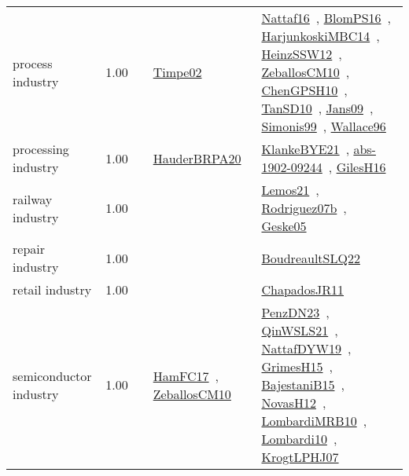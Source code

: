 {\begin{longtable}{p{3cm}r>{\raggedright\arraybackslash}p{6cm}>{\raggedright\arraybackslash}p{6cm}>{\raggedright\arraybackslash}p{8cm}}
\index{process industry}\index{Industries!process industry}process industry &  1.00 &  & \href{../works/Timpe02.pdf}{Timpe02}~\cite{Timpe02} & \href{../works/Nattaf16.pdf}{Nattaf16}~\cite{Nattaf16}, \href{../works/BlomPS16.pdf}{BlomPS16}~\cite{BlomPS16}, \href{../works/HarjunkoskiMBC14.pdf}{HarjunkoskiMBC14}~\cite{HarjunkoskiMBC14}, \href{../works/HeinzSSW12.pdf}{HeinzSSW12}~\cite{HeinzSSW12}, \href{../works/ZeballosCM10.pdf}{ZeballosCM10}~\cite{ZeballosCM10}, \href{../works/ChenGPSH10.pdf}{ChenGPSH10}~\cite{ChenGPSH10}, \href{../works/TanSD10.pdf}{TanSD10}~\cite{TanSD10}, \href{../works/Jans09.pdf}{Jans09}~\cite{Jans09}, \href{../works/Simonis99.pdf}{Simonis99}~\cite{Simonis99}, \href{../works/Wallace96.pdf}{Wallace96}~\cite{Wallace96}\\
\index{processing industry}\index{Industries!processing industry}processing industry &  1.00 &  & \href{../works/HauderBRPA20.pdf}{HauderBRPA20}~\cite{HauderBRPA20} & \href{../works/KlankeBYE21.pdf}{KlankeBYE21}~\cite{KlankeBYE21}, \href{../works/abs-1902-09244.pdf}{abs-1902-09244}~\cite{abs-1902-09244}, \href{../works/GilesH16.pdf}{GilesH16}~\cite{GilesH16}\\
\index{railway industry}\index{Industries!railway industry}railway industry &  1.00 &  &  & \href{../works/Lemos21.pdf}{Lemos21}~\cite{Lemos21}, \href{../works/Rodriguez07b.pdf}{Rodriguez07b}~\cite{Rodriguez07b}, \href{../works/Geske05.pdf}{Geske05}~\cite{Geske05}\\
\index{repair industry}\index{Industries!repair industry}repair industry &  1.00 &  &  & \href{../works/BoudreaultSLQ22.pdf}{BoudreaultSLQ22}~\cite{BoudreaultSLQ22}\\
\index{retail industry}\index{Industries!retail industry}retail industry &  1.00 &  &  & \href{../works/ChapadosJR11.pdf}{ChapadosJR11}~\cite{ChapadosJR11}\\
\index{semiconductor industry}\index{Industries!semiconductor industry}semiconductor industry &  1.00 &  & \href{../works/HamFC17.pdf}{HamFC17}~\cite{HamFC17}, \href{../works/ZeballosCM10.pdf}{ZeballosCM10}~\cite{ZeballosCM10} & \href{../works/PenzDN23.pdf}{PenzDN23}~\cite{PenzDN23}, \href{../works/QinWSLS21.pdf}{QinWSLS21}~\cite{QinWSLS21}, \href{../works/NattafDYW19.pdf}{NattafDYW19}~\cite{NattafDYW19}, \href{../works/GrimesH15.pdf}{GrimesH15}~\cite{GrimesH15}, \href{../works/BajestaniB15.pdf}{BajestaniB15}~\cite{BajestaniB15}, \href{../works/NovasH12.pdf}{NovasH12}~\cite{NovasH12}, \href{../works/LombardiMRB10.pdf}{LombardiMRB10}~\cite{LombardiMRB10}, \href{../works/Lombardi10.pdf}{Lombardi10}~\cite{Lombardi10}, \href{../works/KrogtLPHJ07.pdf}{KrogtLPHJ07}~\cite{KrogtLPHJ07}\\

\end{longtable}}
